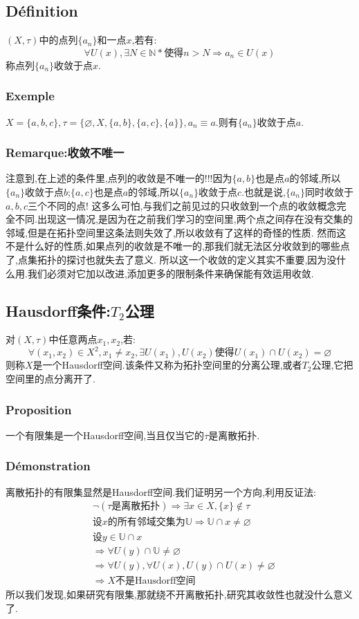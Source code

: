 \documentclass[12pt, a4paper, oneside]{ctexbook}
\begin{document}
  \subsection{Définition}
  $(X,\tau)$中的点列$\{a_n\}$和一点$x$,若有:
  $$
  \forall U(x), \exists N\in \mathbb{N}*\text{使得}n>N\Rightarrow a_n\in U(x)
  $$
  称点列$\{a_n\}$收敛于点$x$.
  \subsubsection{Exemple}
  $X=\{a,b,c\},\tau =\{\varnothing, X, \{a,b\}, \{a,c\}, \{a\}\},a_n\equiv a$.则有$\{a_n\}$收敛于点$a$.
  \subsubsection{Remarque:收敛不唯一}
  注意到,在上述的条件里,点列的收敛是不唯一的!!!因为$\{a,b\}$也是点$a$的邻域,所以$\{a_n\}$收敛于点$b$;$\{a,c\}$也是点$a$的邻域,所以$\{a_n\}$收敛于点$c$.也就是说,$\{a_n\}$同时收敛于$a,b,c$三个不同的点!
  这多么可怕,与我们之前见过的只收敛到一个点的收敛概念完全不同.出现这一情况,是因为在之前我们学习的空间里,两个点之间存在没有交集的邻域,但是在拓扑空间里这条法则失效了,所以收敛有了这样的奇怪的性质.
  然而这不是什么好的性质,如果点列的收敛是不唯一的,那我们就无法区分收敛到的哪些点了,点集拓扑的探讨也就失去了意义.
  所以这一个收敛的定义其实不重要,因为没什么用.我们必须对它加以改进,添加更多的限制条件来确保能有效运用收敛.
  \subsection{Hausdorff条件:$T_2$公理}
  对$(X,\tau)$中任意两点$x_1,x_2$,若:
  $$
    \forall(x_1,x_2)\in X^2, x_1\neq x_2, \exists U(x_1),U(x_2)\text{使得}U(x_1)\cap U(x_2)=\varnothing
  $$
  则称$X$是一个Hausdorff空间.该条件又称为拓扑空间里的分离公理,或者$T_2$公理,它把空间里的点分离开了.
  \subsubsection{Proposition}
  一个有限集是一个Hausdorff空间,当且仅当它的$\tau$是离散拓扑.
  \subsubsection{Démonstration}
  离散拓扑的有限集显然是Hausdorff空间.我们证明另一个方向,利用反证法:
  $$
  \begin{aligned}&
    \lnot (\tau\text{是离散拓扑})\Rightarrow \exists x\in X, \{x\}\notin \tau\\&
    \text{设}x \text{的所有邻域交集为}\mathbb{U}\Rightarrow\mathbb{U}\cap x\neq\varnothing \\&
    \text{设}y\in\mathbb{U}\cap x\\&
    \Rightarrow \forall U(y)\cap\mathbb{U}\neq\varnothing\\&
    \Rightarrow \forall U(y),\forall U(x),U(y)\cap U(x)\neq\varnothing\\&
    \Rightarrow X\text{不是Hausdorff空间}
    \end{aligned}
  $$
  所以我们发现,如果研究有限集,那就绕不开离散拓扑,研究其收敛性也就没什么意义了.
\end{document}
